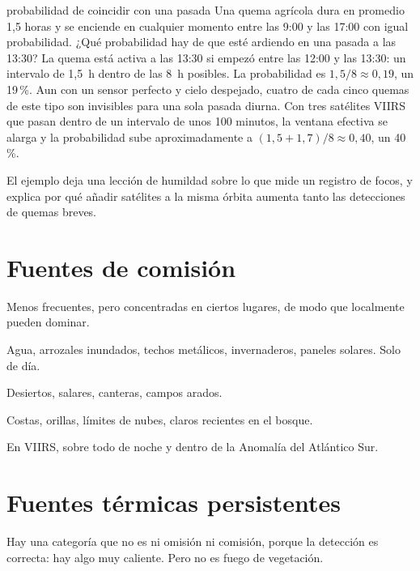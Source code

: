 \begin{ejemplo}{probabilidad de coincidir con una pasada}
Una quema agrícola dura en promedio 1,5 horas y se enciende en cualquier momento entre las 9:00
y las 17:00 con igual probabilidad. ¿Qué probabilidad hay de que esté ardiendo en una pasada a
las 13:30?
\solucion La quema está activa a las 13:30 si empezó entre las 12:00 y las 13:30: un intervalo
de 1,5~h dentro de las 8~h posibles. La probabilidad es $1{,}5/8 \approx 0{,}19$, un 19\,{}\%. Aun con un
sensor perfecto y cielo despejado, cuatro de cada cinco quemas de este tipo son invisibles para
una sola pasada diurna. Con tres satélites VIIRS que pasan dentro de un intervalo de unos 100
minutos, la ventana efectiva se alarga y la probabilidad sube aproximadamente a
$(1{,}5 + 1{,}7)/8 \approx 0{,}40$, un 40\,{}\%.
\end{ejemplo}

El ejemplo deja una lección de humildad sobre lo que mide un registro de focos, y explica por
qué añadir satélites a la misma órbita aumenta tanto las detecciones de quemas breves.

\section{Fuentes de comisión}

Menos frecuentes, pero concentradas en ciertos lugares, de modo que localmente pueden dominar.

\begin{description}[leftmargin=1.2em,style=nextline]
  \item[Brillo solar.] Agua, arrozales inundados, techos metálicos, invernaderos, paneles
  solares. Solo de día.
  \item[Suelos calientes y reflectantes.] Desiertos, salares, canteras, campos arados.
  \item[Bordes.] Costas, orillas, límites de nubes, claros recientes en el bosque.
  \item[Ruido del detector.] En VIIRS, sobre todo de noche y dentro de la Anomalía del
  Atlántico Sur.
\end{description}

\section{Fuentes térmicas persistentes}

Hay una categoría que no es ni omisión ni comisión, porque la detección es correcta: hay algo
muy caliente. Pero no es fuego de vegetación.

